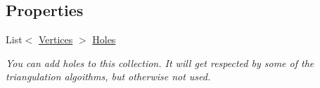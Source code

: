 \subsection*{Properties}
\begin{DoxyCompactItemize}
\item 
List$<$ \hyperlink{class_farseer_physics_1_1_common_1_1_vertices}{Vertices} $>$ \hyperlink{class_farseer_physics_1_1_common_1_1_vertices_a3967b79e34107fbe5d81f1a2940bdc24}{Holes}
\begin{DoxyCompactList}\small\item\em You can add holes to this collection. It will get respected by some of the triangulation algoithms, but otherwise not used. \end{DoxyCompactList}\end{DoxyCompactItemize}


